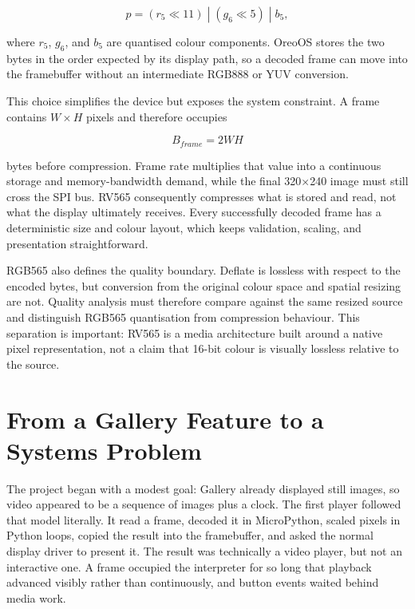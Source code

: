 \documentclass[11pt,twocolumn]{article}
\begin{document}
\begin{equation}
p=(r_5 \ll 11)\;|\;(g_6 \ll 5)\;|\;b_5,
\end{equation}

where $r_5$, $g_6$, and $b_5$ are quantised colour components.  OreoOS stores
the two bytes in the order expected by its display path, so a decoded frame can
move into the framebuffer without an intermediate RGB888 or YUV conversion.

This choice simplifies the device but exposes the system constraint.  A frame
contains $W\times H$ pixels and therefore occupies

\begin{equation}
B_{frame}=2WH
\end{equation}

bytes before compression.  Frame rate multiplies that value into a continuous
storage and memory-bandwidth demand, while the final 320$\times$240 image must
still cross the SPI bus.  RV565 consequently compresses what is stored and
read, not what the display ultimately receives.  Every successfully decoded
frame has a deterministic size and colour layout, which keeps validation,
scaling, and presentation straightforward.

RGB565 also defines the quality boundary.  Deflate is lossless with respect to
the encoded bytes, but conversion from the original colour space and spatial
resizing are not.  Quality analysis must therefore compare against the same
resized source and distinguish RGB565 quantisation from compression behaviour.
This separation is important: RV565 is a media architecture built around a
native pixel representation, not a claim that 16-bit colour is visually
lossless relative to the source.

\section{From a Gallery Feature to a Systems Problem}

The project began with a modest goal: Gallery already displayed still images,
so video appeared to be a sequence of images plus a clock.  The first player
followed that model literally.  It read a frame, decoded it in MicroPython,
scaled pixels in Python loops, copied the result into the framebuffer, and
asked the normal display driver to present it.  The result was technically a
video player, but not an interactive one.  A frame occupied the interpreter
for so long that playback advanced visibly rather than continuously, and
button events waited behind media work.
\end{document}
